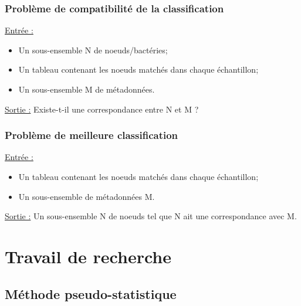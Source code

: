 \documentclass{beamer}
\begin{document}

\begin{frame}
\frametitle{Problème de compatibilité de la classification}

\uline{Entrée :} \begin{itemize} \item Un sous-ensemble N de noeuds/bactéries; \item Un tableau contenant les noeuds matchés dans chaque échantillon; \item Un sous-ensemble M de métadonnées. \end{itemize}

\bigskip
\uline{Sortie :} Existe-t-il une correspondance entre N et M ?


\end{frame}

\begin{frame}
\frametitle{Problème de meilleure classification}

\uline{Entrée :} \begin{itemize} \item Un tableau contenant les noeuds matchés dans chaque échantillon; \item Un sous-ensemble de métadonnées M. \end{itemize}

\bigskip
\uline{Sortie :} Un sous-ensemble N de noeuds tel que N ait une correspondance avec M.


\end{frame}

\section{Travail de recherche}


\subsection{Méthode pseudo-statistique}
\end{document}
